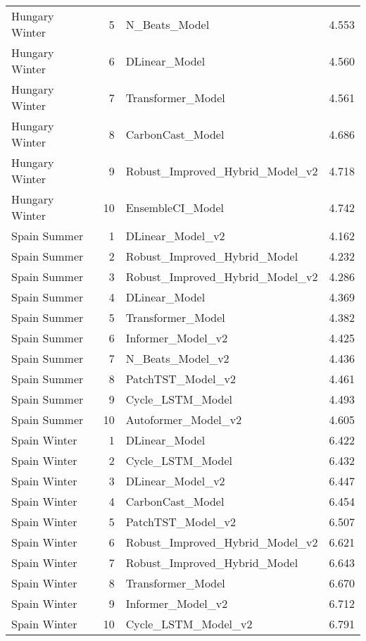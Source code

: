 \begin{tabular}{l r l r}
Hungary Winter & 5 & N\_Beats\_Model & 4.553 \\
Hungary Winter & 6 & DLinear\_Model & 4.560 \\
Hungary Winter & 7 & Transformer\_Model & 4.561 \\
Hungary Winter & 8 & CarbonCast\_Model & 4.686 \\
Hungary Winter & 9 & Robust\_Improved\_Hybrid\_Model\_v2 & 4.718 \\
Hungary Winter & 10 & EnsembleCI\_Model & 4.742 \\
Spain Summer & 1 & DLinear\_Model\_v2 & 4.162 \\
Spain Summer & 2 & Robust\_Improved\_Hybrid\_Model & 4.232 \\
Spain Summer & 3 & Robust\_Improved\_Hybrid\_Model\_v2 & 4.286 \\
Spain Summer & 4 & DLinear\_Model & 4.369 \\
Spain Summer & 5 & Transformer\_Model & 4.382 \\
Spain Summer & 6 & Informer\_Model\_v2 & 4.425 \\
Spain Summer & 7 & N\_Beats\_Model\_v2 & 4.436 \\
Spain Summer & 8 & PatchTST\_Model\_v2 & 4.461 \\
Spain Summer & 9 & Cycle\_LSTM\_Model & 4.493 \\
Spain Summer & 10 & Autoformer\_Model\_v2 & 4.605 \\
Spain Winter & 1 & DLinear\_Model & 6.422 \\
Spain Winter & 2 & Cycle\_LSTM\_Model & 6.432 \\
Spain Winter & 3 & DLinear\_Model\_v2 & 6.447 \\
Spain Winter & 4 & CarbonCast\_Model & 6.454 \\
Spain Winter & 5 & PatchTST\_Model\_v2 & 6.507 \\
Spain Winter & 6 & Robust\_Improved\_Hybrid\_Model\_v2 & 6.621 \\
Spain Winter & 7 & Robust\_Improved\_Hybrid\_Model & 6.643 \\
Spain Winter & 8 & Transformer\_Model & 6.670 \\
Spain Winter & 9 & Informer\_Model\_v2 & 6.712 \\
Spain Winter & 10 & Cycle\_LSTM\_Model\_v2 & 6.791 \\
\bottomrule
\end{tabular}
